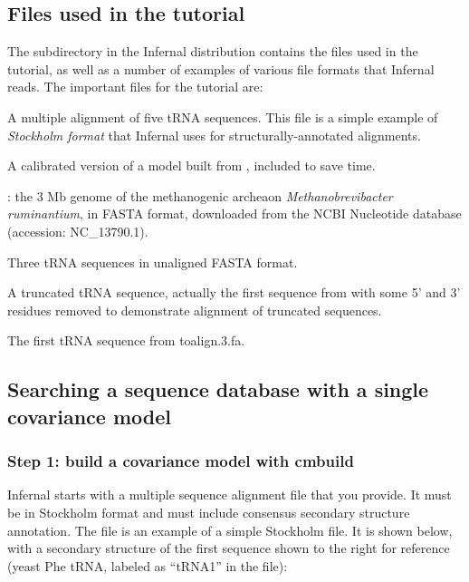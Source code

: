 \subsection{Files used in the tutorial}

The subdirectory  in the Infernal distribution contains the
files used in the tutorial, as well as a number of examples of various
file formats that Infernal reads. The important files for the tutorial
are:

\begin{sreitems}{}
\item[\prog{tRNA5.sto}] A multiple alignment of five tRNA
  sequences. This file is a simple example of \emph{Stockholm
    format} that Infernal uses for structurally-annotated alignments.
%
\item[\prog{tRNA5.c.cm}] A calibrated version of a model built from
  , included to save time. 
%
\item[\prog{mrum-genome.fa}]: the 3 Mb genome of the methanogenic archeaon 
  \emph{Methanobrevibacter ruminantium}, in
  FASTA format, downloaded from the NCBI Nucleotide database
  (accession: NC\_13790.1). 
%
\item[\prog{toalign.3.fa}] Three tRNA sequences
  in unaligned FASTA format.
%
\item[\prog{toalign.1trunc.fa}] A truncated tRNA sequence, actually
  the first sequence from  with some 5' and 3'
  residues removed to demonstrate alignment of truncated
  sequences.
%
\item[\prog{toalign.1.fa}] The first tRNA sequence from toalign.3.fa.
\end{sreitems}

\subsection{Searching a sequence database with a single covariance model}

\subsubsection{Step 1: build a covariance model with cmbuild}

Infernal starts with a multiple sequence alignment file that you
provide. It must be in Stockholm format and must include consensus
secondary structure annotation. The file  is
an example of a simple Stockholm file. It is shown below, with a
secondary structure of the first sequence shown to the right for
reference (yeast Phe tRNA, labeled as ``tRNA1'' in the file):

